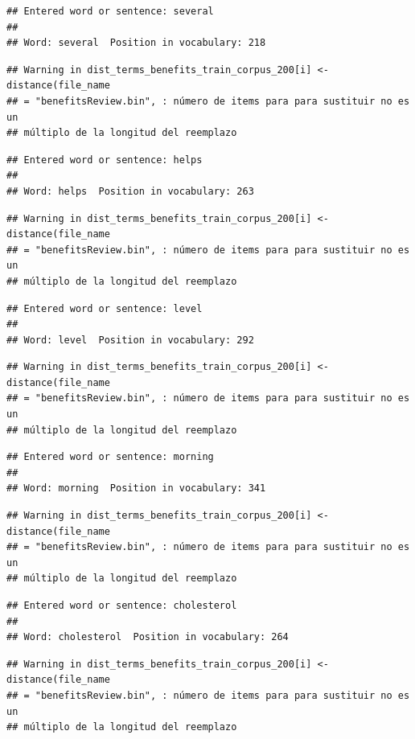 \documentclass[spanish,]{article}
\begin{document}
\begin{verbatim}
## Entered word or sentence: several
## 
## Word: several  Position in vocabulary: 218
\end{verbatim}

\begin{verbatim}
## Warning in dist_terms_benefits_train_corpus_200[i] <- distance(file_name
## = "benefitsReview.bin", : número de items para para sustituir no es un
## múltiplo de la longitud del reemplazo
\end{verbatim}

\begin{verbatim}
## Entered word or sentence: helps
## 
## Word: helps  Position in vocabulary: 263
\end{verbatim}

\begin{verbatim}
## Warning in dist_terms_benefits_train_corpus_200[i] <- distance(file_name
## = "benefitsReview.bin", : número de items para para sustituir no es un
## múltiplo de la longitud del reemplazo
\end{verbatim}

\begin{verbatim}
## Entered word or sentence: level
## 
## Word: level  Position in vocabulary: 292
\end{verbatim}

\begin{verbatim}
## Warning in dist_terms_benefits_train_corpus_200[i] <- distance(file_name
## = "benefitsReview.bin", : número de items para para sustituir no es un
## múltiplo de la longitud del reemplazo
\end{verbatim}

\begin{verbatim}
## Entered word or sentence: morning
## 
## Word: morning  Position in vocabulary: 341
\end{verbatim}

\begin{verbatim}
## Warning in dist_terms_benefits_train_corpus_200[i] <- distance(file_name
## = "benefitsReview.bin", : número de items para para sustituir no es un
## múltiplo de la longitud del reemplazo
\end{verbatim}

\begin{verbatim}
## Entered word or sentence: cholesterol
## 
## Word: cholesterol  Position in vocabulary: 264
\end{verbatim}

\begin{verbatim}
## Warning in dist_terms_benefits_train_corpus_200[i] <- distance(file_name
## = "benefitsReview.bin", : número de items para para sustituir no es un
## múltiplo de la longitud del reemplazo
\end{verbatim}
\end{document}
